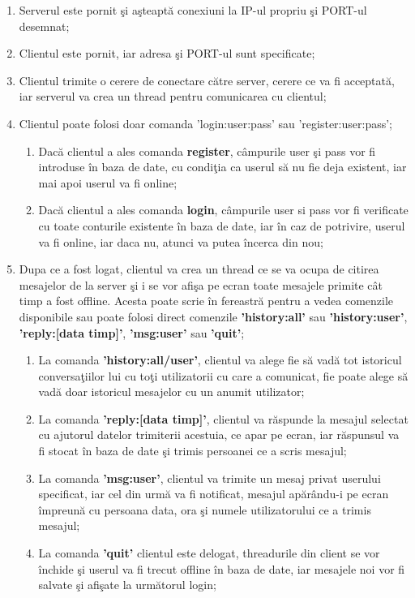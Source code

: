 \documentclass[runningheads]{llncs}
\begin{document}
\begin{enumerate}
	\item Serverul este pornit \c si a\c steapt\u a conexiuni la IP-ul propriu \c si PORT-ul desemnat;
	\newline
	\item Clientul este pornit, iar adresa \c si PORT-ul sunt specificate;
	\newline
	\item Clientul trimite o cerere de conectare c\u atre server, cerere ce va fi acceptat\u a, iar serverul va crea un thread pentru comunicarea cu clientul;
	\newline
	\item Clientul poate folosi doar comanda 'login:user:pass' sau 'register:user:pass';
	\begin{enumerate}
		\item Dac\u a clientul a ales comanda {\bf register}, c\^ ampurile user \c si pass vor fi introduse \^ in baza de date, cu condi\c tia ca userul s\u a nu fie deja existent, iar mai apoi userul va fi online;
		\item Dac\u a clientul a ales comanda {\bf login}, c\^ ampurile user si pass vor fi verificate cu toate conturile existente \^ in baza de date, iar \^ in caz de potrivire, userul va fi online, iar daca nu, atunci va putea \^ incerca din nou;
		\newline
	\end{enumerate}
	\item Dupa ce a fost logat, clientul va crea un thread ce se va ocupa de citirea mesajelor de la server \c si i se vor afi\c sa pe ecran toate mesajele primite c\^ at timp a fost offline. Acesta poate scrie \^ in fereastr\u a pentru a vedea comenzile disponibile sau poate folosi direct comenzile {\bf 'history:all'} sau {\bf 'history:user'}, {\bf 'reply:[data timp]'}, {\bf 'msg:user'} sau {\bf 'quit'};
	\begin{enumerate}
		\item La comanda {\bf 'history:all/user'}, clientul va alege fie s\u a vad\u a tot istoricul conversa\c tiilor lui cu to\c ti utilizatorii cu care a comunicat, fie poate alege s\u a vad\u a doar istoricul mesajelor cu un anumit utilizator;
		\item La comanda {\bf 'reply:[data timp]'}, clientul va r\u aspunde la mesajul selectat cu ajutorul datelor trimiterii acestuia, ce apar pe ecran, iar r\u aspunsul va fi stocat \^ in baza de date \c si trimis persoanei ce a scris mesajul;
		\item La comanda {\bf 'msg:user'}, clientul va trimite un mesaj privat userului specificat, iar cel din urm\u a va fi notificat, mesajul ap\u ar\^ andu-i pe ecran \^ impreun\u a cu persoana data, ora \c si numele utilizatorului ce a trimis mesajul;
		\item La comanda {\bf 'quit'} clientul este delogat, threadurile din client se vor \^ inchide \c si userul va fi trecut offline \^ in baza de date, iar mesajele noi vor fi salvate \c si afi\c sate la urm\u atorul login;
		\newline
	\end{enumerate}
\end{enumerate}
\end{document}
